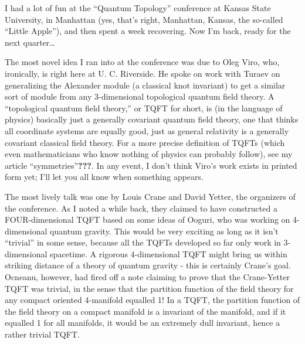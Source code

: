 \documentclass{article}
\begin{document}
I had a lot of fun at the ``Quantum Topology'' conference at Kansas
State University, in Manhattan (yes, that's right, Manhattan, Kansas,
the so-called ``Little Apple''), and then spent a week recovering. Now
I'm back, ready for the next quarter\ldots{}

The most novel idea I ran into at the conference was due to Oleg Viro,
who, ironically, is right here at U. C. Riverside. He spoke on work with
Turaev on generalizing the Alexander module (a classical knot invariant)
to get a similar sort of module from any 3-dimensional topological
quantum field theory. A ``topological quantum field theory,'' or TQFT
for short, is (in the language of physics) basically just a generally
covariant quantum field theory, one that thinks all coordinate systems
are equally good, just as general relativity is a generally covariant
classical field theory. For a more precise definition of TQFTs (which
even mathematicians who know nothing of physics can probably follow),
see my article ``symmetries''\textbf{???}. In any event, I don't think
Viro's work exists in printed form yet; I'll let you all know when
something appears.

The most lively talk was one by Louis Crane and David Yetter, the
organizers of the conference. As I noted a while back, they claimed to
have constructed a FOUR-dimensional TQFT based on some ideas of Ooguri,
who was working on 4-dimensional quantum gravity. This would be very
exciting as long as it isn't ``trivial'' in some sense, because all the
TQFTs developed so far only work in 3-dimensional spacetime. A rigorous
4-dimensional TQFT might bring us within striking distance of a theory
of quantum gravity - this is certainly Crane's goal. Ocneanu, however,
had fired off a note claiming to prove that the Crane-Yetter TQFT was
trivial, in the sense that the partition function of the field theory
for any compact oriented 4-manifold equalled 1! In a TQFT, the partition
function of the field theory on a compact manifold is a invariant of the
manifold, and if it equalled 1 for all manifolds, it would be an
extremely dull invariant, hence a rather trivial TQFT.
\end{document}
